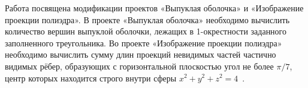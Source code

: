 Работа посвящена модификации проектов «Выпуклая оболочка» и
«Изображение проекции полиэдра». В проекте  «Выпуклая оболочка» необходимо вычислить количество вершин выпуклой оболочки, 
лежащих в 1-окрестности заданного заполненного треугольника. 
Во проекте «Изображение проекции полиэдра» необходимо вычислить сумму длин проекций невидимых частей частично видимых рёбер, образующих с горизонтальной плоскостью угол не более $\pi/7$,  
центр которых находится строго внутри сферы  $x^2+y^2+z^2=4$~.

